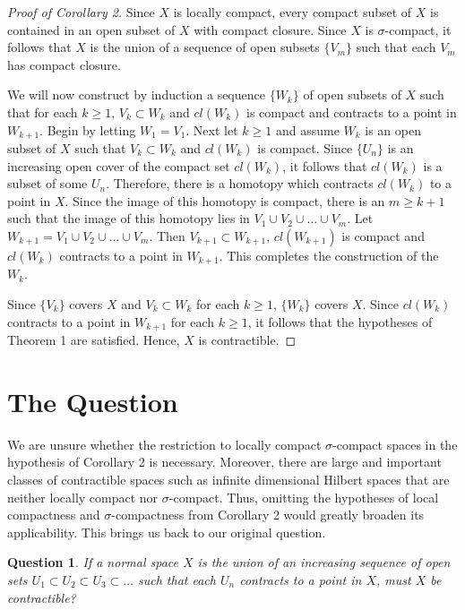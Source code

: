 \documentclass[12pt]{amsart}%
\newtheorem{Question}{Question}
\theoremstyle{plain}
\numberwithin{equation}{section}
\begin{document}
\begin{proof}[Proof of Corollary 2] Since $X$ is locally compact, every compact subset of $X$ is contained in an open subset of $X$ with compact closure.  Since $X$ is $\sigma$-compact, it follows that $X$ is the union of a sequence of open subsets $\{V_m\}$ such that each $V_m$ has compact closure.  

\indent We will now construct by induction a sequence $\{W_k\}$ of open subsets of $X$ such that for each $k \geq 1$, $V_k \subset W_k$ and $cl(W_k)$ is compact and contracts to a point in $W_{k+1}$.  Begin by letting $W_1 = V_1$.  Next let $k \geq 1$ and assume $W_k$ is an open subset of $X$ such that $V_k \subset W_k$ and $cl(W_k)$ is compact.  Since $\{U_n\}$ is an increasing open cover of the compact set $cl(W_k)$, it follows that $cl(W_k)$ is a subset of some $U_n$.  Therefore, there is a homotopy which contracts $cl(W_k)$ to a point in $X$.  Since the image of this homotopy is compact, there is an $m \geq k+1$ such that the image of this homotopy lies in $V_1 \cup V_2 \cup \dots \cup V_m$.  Let $W_{k+1} = V_1 \cup V_2 \cup \dots \cup V_m$.  Then $V_{k+1} \subset W_{k+1}$, $cl(W_{k+1})$ is compact and $cl(W_k)$ contracts to a point in $W_{k+1}$.  This completes the construction of the $W_k$.

\indent Since $\{V_k\}$ covers $X$ and $V_k \subset W_k$ for each $k \geq 1$, $\{W_k\}$ covers $X$.  Since $cl(W_k)$ contracts to a point in $W_{k+1}$ for each $k \geq 1$, it follows that the hypotheses of Theorem 1 are satisfied.  Hence, $X$ is contractible. \end{proof}

\section{The Question}

\indent We are unsure whether the restriction to locally compact $\sigma$-compact spaces in the hypothesis of Corollary 2 is necessary.  Moreover, there are large and important classes of contractible spaces such as infinite dimensional Hilbert spaces that are neither locally compact nor $\sigma$-compact.  Thus, omitting the hypotheses of local compactness and $\sigma$-compactness from Corollary 2 would greatly broaden its applicability. This brings us back to our original question.

\begin{Question} If a normal space $X$ is the union of an increasing sequence of open sets $U_1 \subset U_2 \subset U_3 \subset \dots$ such that each $U_n$ contracts to a point in $X$, must $X$ be contractible? \end{Question}
\end{document}
